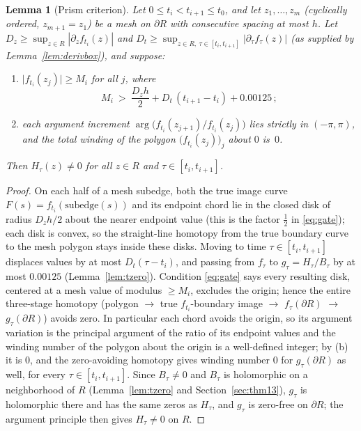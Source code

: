 \documentclass[11pt]{article}
\newtheorem{lemma}[theorem]{Lemma}
\theoremstyle{definition}
\begin{document}
\begin{lemma}[Prism criterion]\label{lem:prism}
Let $0\le t_i<t_{i+1}\le t_0$, and let $z_1,\dots,z_m$
(cyclically ordered, $z_{m+1}=z_1$) be a mesh on $\partial R$ with
consecutive spacing at most $h$. Let $D_z\ge\sup_{z\in R}|\partial_zf_{t_i}(z)|$ and
$D_t\ge\sup_{z\in R,\ \tau\in[t_i,t_{i+1}]}
|\partial_\tau f_\tau(z)|$ (as supplied by
Lemma~\ref{lem:derivbox}), and suppose:
\begin{enumerate}
\item[\textup{(a)}] $\bigl|f_{t_i}(z_j)\bigr|\ge M_i$ for all $j$,
where
\begin{equation}\label{eq:gate}
M_i\ >\ \frac{D_{z}h}{2}
+D_{t}\,(t_{i+1}-t_i)+0.00125\,;
\end{equation}
\item[\textup{(b)}] each argument increment
$\arg\bigl(f_{t_i}(z_{j+1})/f_{t_i}(z_j)\bigr)$ lies strictly in
$(-\pi,\pi)$, and the total winding of the polygon
$\bigl(f_{t_i}(z_j)\bigr)_j$ about $0$ is~$0$.
\end{enumerate}
Then $H_\tau(z)\neq0$ for all $z\in R$ and
$\tau\in[t_i,t_{i+1}]$.
\end{lemma}

\begin{proof}
On each half of a mesh subedge, both the true image curve
$F(s)=f_{t_i}(\text{subedge}(s))$ and its endpoint chord lie in the
closed disk of radius $D_{z}h/2$ about the nearer endpoint value
(this is the factor $\frac12$ in \eqref{eq:gate}); each disk is
convex, so the straight-line homotopy from the true boundary curve
to the mesh polygon stays inside these disks. Moving to time
$\tau\in[t_i,t_{i+1}]$ displaces values by at most
$D_{t}(\tau-t_i)$, and passing from $f_\tau$ to
$g_\tau=H_\tau/B_\tau$ by at most $0.00125$
(Lemma~\ref{lem:tzero}). Condition \eqref{eq:gate} says every
resulting disk, centered at a mesh value of modulus $\ge M_i$,
excludes the origin; hence the entire three-stage homotopy (polygon
$\to$ true $f_{t_i}$-boundary image $\to$ $f_\tau(\partial R)$ $\to$
$g_\tau(\partial R)$) avoids zero. In particular each chord avoids
the origin, so its argument variation is the principal argument of
the ratio of its endpoint values and the winding number of the
polygon about the origin is a well-defined integer; by (b) it is
$0$, and the zero-avoiding homotopy gives winding number $0$ for
$g_\tau(\partial R)$ as well, for every $\tau\in[t_i,t_{i+1}]$.
Since $B_\tau\neq0$ and $B_\tau$ is holomorphic on a neighborhood
of $R$ (Lemma~\ref{lem:tzero} and Section~\ref{sec:thm13}),
$g_\tau$ is holomorphic there and has the same zeros as $H_\tau$,
and $g_\tau$ is zero-free on $\partial R$; the argument principle
then gives $H_\tau\neq0$ on $R$.
\end{proof}
\end{document}
